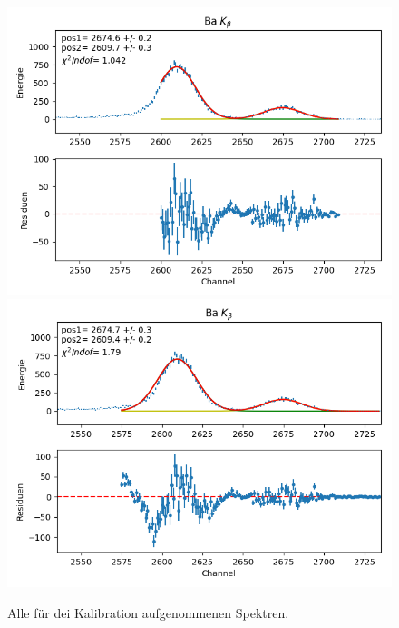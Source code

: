 \documentclass[12pt,a4paper]{article}
\begin{document}
\begin{figure}[H]
\centering
\includegraphics[scale=0.8]{Bilder/alpha/ba_beta_1.png}
\includegraphics[scale=0.8]{Bilder/alpha/ba_beta_2.png}
\caption{Alle für dei Kalibration aufgenommenen Spektren.}
\label{fig:kal_alles}
\end{figure}
\end{document}
